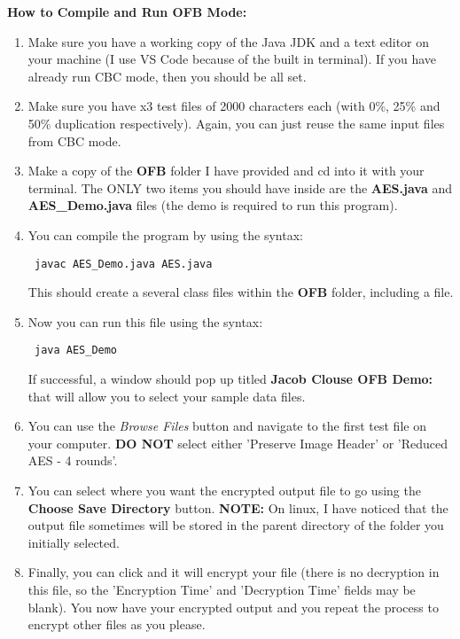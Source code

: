 \documentclass[10pt]{article}
\begin{document}
\vspace{0.2in}
\noindent \textbf{How to Compile and Run OFB Mode: } 
\begin{enumerate}
	\item Make sure you have a working copy of the Java JDK and a text editor on your machine (I use VS Code because of the built in terminal). If you have already run CBC mode, then you should be all set.
	
	\item Make sure you have x3 test files of 2000 characters each (with 0\%, 25\% and 50\% duplication respectively). Again, you can just reuse the same input files from CBC mode. 
	
	\item Make a copy of the \textbf{OFB} folder I have provided and cd into it with your terminal. The ONLY two items you should have inside are the \textbf{AES.java} and \textbf{AES\_Demo.java} files (the demo is required to run this program).
	
	\item You can compile the program by using the syntax: \begin{verbatim} javac AES_Demo.java AES.java \end{verbatim}
	This should create a several class files within the \textbf{OFB} folder, including a  file.
	
	\item Now you can run this file using the syntax: 
	\begin{verbatim} java AES_Demo \end{verbatim} 
	If successful, a window should pop up titled \textbf{Jacob Clouse OFB Demo:} that will allow you to select your sample data files. 
	
	\item You can use the \textit{Browse Files} button and navigate to the first test file on your computer. \textbf{DO NOT} select either 'Preserve Image Header' or 'Reduced AES - 4 rounds'. 
	
	\item You can select where you want the encrypted output file to go using the \textbf{Choose Save Directory} button. \textbf{NOTE:} On linux, I have noticed that the output file sometimes will be stored in the parent directory of the folder you initially selected. 
	
	\item Finally, you can click  and it will encrypt your file (there is no decryption in this file, so the 'Encryption Time' and  'Decryption Time' fields may be blank). You now have your encrypted output and you repeat the process to encrypt other files as you please.
	
\end{enumerate}
\vspace{0.2in}
\end{document}
